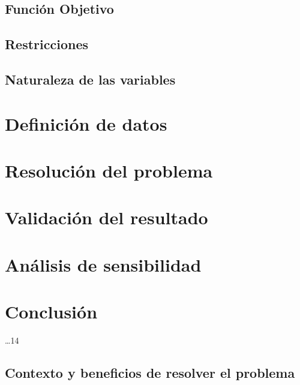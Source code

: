 \documentclass[letterpaper]{article}
\begin{document}
\begin{flushleft}
\subsection{Función Objetivo} 
\subsection{Restricciones} 
\subsection{Naturaleza de las variables} 

\section{Definición de datos} 
\section{Resolución del problema} 
\section{Validación del resultado} 
\section{Análisis de sensibilidad} 
\section{Conclusión} \dots 14
\end{flushleft}

\subsection{Contexto y beneficios de resolver el problema} 
\end{document}
